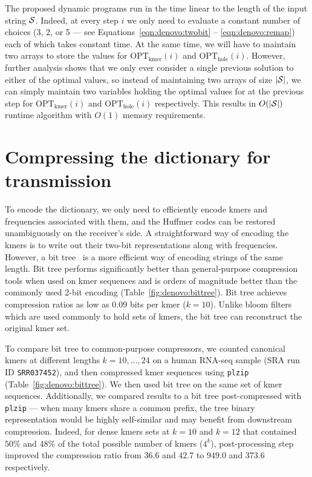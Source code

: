 \documentclass[12pt]{cmuthesis}
\begin{document}
  The proposed dynamic programs run in the time linear to the length of the input string $\mathcal{S}$. Indeed, at every step $i$ we only need to evaluate a constant number of choices (3, 2, or 5 --- see Equations~\ref{eqn:denovo:twobit} -- \ref{eqn:denovo:remap}) each of which takes constant time. At the same time, we will have to maintain two arrays to store the values for $\mathrm{OPT_{kmer}}(i)$ and $\mathrm{OPT_{hole}}(i)$. However, further analysis shows that we only ever consider a single previous solution to either of the optimal values, so instead of maintaining two arrays of size $|\mathcal{S}|$, we can simply maintain two variables holding the optimal values for at the previous step for $\mathrm{OPT_{kmer}}(i)$ and $\mathrm{OPT_{hole}}(i)$ respectively. This results in $O(|\mathcal{S}|)$ runtime algorithm with $O(1)$ memory requirements.

%
\section{Compressing the dictionary for transmission}

To encode the dictionary, we only need to efficiently encode kmers and frequencies associated with them, and the Huffmer codes can be restored unambiguously on the receiver's side. A straightforward way of encoding the kmers is to write out their two-bit representations along with frequencies. However, a bit tree~\cite{PathEncode} is a more efficient way of encoding strings of the same length. Bit tree performs significantly better than general-purpose compression tools when used on kmer sequences and is orders of magnitude better than the commonly used 2-bit encoding (Table~\ref{fig:denovo:bittree}). Bit tree achieves compression ratios as low as 0.09 bits per kmer ($k=10$). Unlike bloom filters which are used commonly to hold sets of kmers, the bit tree can reconstruct the original kmer set.

To compare bit tree to common-purpose compressors, we counted canonical kmers at different lengths $k = 10, \ldots, 24$ on a human RNA-seq sample (SRA run ID \texttt{SRR037452}), and then compressed kmer sequences using \texttt{plzip} (Table~\ref{fig:denovo:bittree}). We then used bit tree on the same set of kmer sequences. Additionally, we compared results to a bit tree post-compressed with \texttt{plzip} --- when many kmers share a common prefix, the tree binary representation would be highly self-similar and may benefit from downstream compression. Indeed, for dense kmers sets at $k=10$ and $k=12$ that contained $50\%$ and $48\%$ of the total possible number of kmers ($4^k$), post-processing step improved the compression ratio from $36.6$ and $42.7$ to $949.0$ and $373.6$ respectively.
\end{document}
